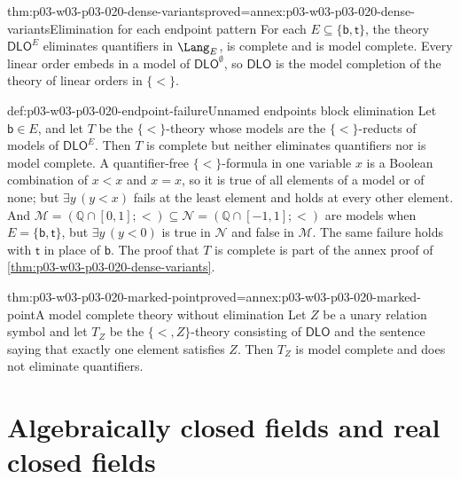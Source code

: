 \begin{hbtheorem}{thm:p03-w03-p03-020-dense-variants}{proved=annex:p03-w03-p03-020-dense-variants}{Elimination for each endpoint pattern}
For each \(E\subseteq\{\mathsf{b},\mathsf{t}\}\), the theory
\(\mathsf{DLO}^{E}\) eliminates quantifiers in \(\Lang_E\), is complete and
is model complete. Every linear order embeds in a model of
\(\mathsf{DLO}^{\emptyset}\), so \(\mathsf{DLO}\) is the model completion of
the theory of linear orders in \(\{<\}\).
\end{hbtheorem}

\begin{hbwarning}{def:p03-w03-p03-020-endpoint-failure}{Unnamed endpoints block elimination}
Let \(\mathsf{b}\in E\), and let \(T\) be the \(\{<\}\)-theory whose models
are the \(\{<\}\)-reducts of models of \(\mathsf{DLO}^{E}\). Then \(T\) is
complete but neither eliminates quantifiers nor is model complete. A
quantifier-free \(\{<\}\)-formula in one variable \(x\) is a Boolean
combination of \(x<x\) and \(x=x\), so it is true of all elements of a
model or of none; but \(\exists y\,(y<x)\) fails at the least element and
holds at every other element. And
\(\mathcal M=(\mathbb Q\cap[0,1];<)\subseteq\mathcal N=(\mathbb Q\cap[-1,1];<)\)
are models when \(E=\{\mathsf{b},\mathsf{t}\}\), but \(\exists y\,(y<0)\) is
true in \(\mathcal N\) and false in \(\mathcal M\). The same failure holds
with \(\mathsf{t}\) in place of \(\mathsf{b}\). The proof that \(T\) is
complete is part of the annex proof of
\cref{thm:p03-w03-p03-020-dense-variants}.
\end{hbwarning}

\begin{hbtheorem}{thm:p03-w03-p03-020-marked-point}{proved=annex:p03-w03-p03-020-marked-point}{A model complete theory without elimination}
Let \(Z\) be a unary relation symbol and let \(T_Z\) be the
\(\{<,Z\}\)-theory consisting of \(\mathsf{DLO}\) and the sentence saying
that exactly one element satisfies \(Z\). Then \(T_Z\) is model complete and
does not eliminate quantifiers.
\end{hbtheorem}

\section{Algebraically closed fields and real closed fields}
\label{sec:p03-w03-p03-020-fields}

